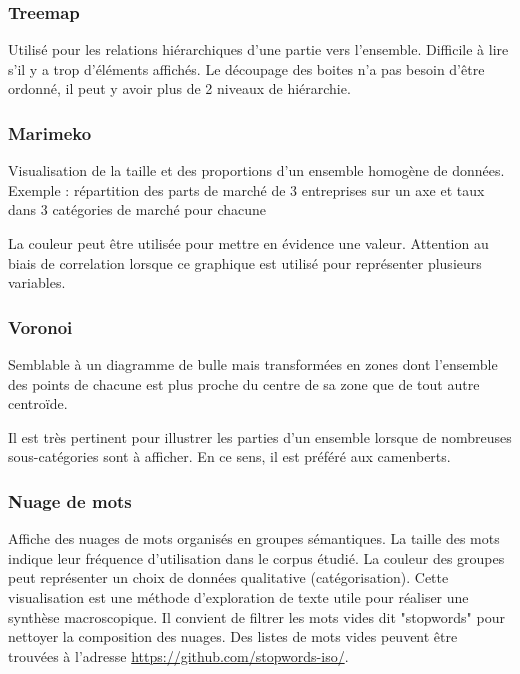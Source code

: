 \documentclass[a4paper,12pt]{article}
\begin{document}
\begin{multicols}{2}
\subsubsection{Treemap}
\label{sec:org0073a61}
Utilisé pour les relations hiérarchiques d'une partie vers l'ensemble. Difficile à lire s'il y a trop d'éléments affichés. \autocite{alansmithLexiqueVisuel}
Le découpage des boites n'a pas besoin d'être ordonné, il peut y avoir plus de 2 niveaux de hiérarchie. \autocite{mikeyiHowChooseRight2020}
\subsubsection{Marimeko}
\label{sec:orgc4001aa}
Visualisation de la taille et des proportions d'un ensemble homogène de données. \autocite{alansmithLexiqueVisuel}
Exemple : répartition des parts de marché de 3 entreprises sur un axe et taux dans 3 catégories de marché pour chacune

La couleur peut être utilisée pour mettre en évidence une valeur. \autocite{jonathanschwabishComparingCategories2021} Attention au biais de correlation lorsque ce graphique est utilisé pour représenter plusieurs variables. \autocite{jonathanschwabishComparingCategories2021}
\subsubsection{Voronoi}
\label{sec:org8767ed3}
Semblable à un diagramme de bulle mais transformées en zones dont l'ensemble des points de chacune est plus proche du centre de sa zone que de tout autre centroïde. \autocite{alansmithLexiqueVisuel}

Il est très pertinent pour illustrer les parties d'un ensemble lorsque de nombreuses sous-catégories sont à afficher. \autocite{jonathanschwabishParttowhole2021} En ce sens, il est préféré aux camenberts.
\subsubsection{Nuage de mots}
\label{sec:org8745736}
Affiche des nuages de mots organisés en groupes sémantiques. La taille des mots indique leur fréquence d'utilisation dans le corpus étudié. La couleur des groupes peut représenter un choix de données qualitative (catégorisation). \autocite{sosulskiGraphics2019} Cette visualisation est une méthode d'exploration de texte utile pour réaliser une synthèse macroscopique.
Il convient de filtrer les mots vides dit "stopwords" pour nettoyer la composition des nuages. \autocite{jonathanschwabishQualitative2021} Des listes de mots vides peuvent être trouvées à l'adresse \url{https://github.com/stopwords-iso/}.

\end{multicols}
\end{document}
